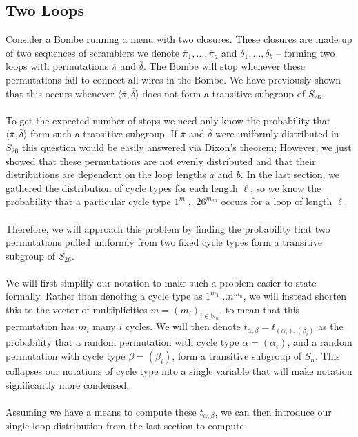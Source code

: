 \subsection{Two Loops}
Consider a Bombe running a menu with two closures. These closures are
made up of two sequences of scramblers we denote $\overline\pi_1,
\dots, \overline\pi_a$ and
$\overline\delta_1,\dots,\overline\delta_b$ -- forming two loops with
permutations $\overline\pi$ and $\overline\delta$. The Bombe will
stop whenever these permutations fail to connect all wires in the
Bombe. We have previously shown that this occurs whenever $\langle
\overline\pi, \overline\delta \rangle$ does not form a transitive
subgroup of $S_{26}$.
\\\\To get the expected number of stops we need only know the
probability that $\langle \overline\pi, \overline\delta \rangle$ form
such a transitive subgroup. If $\overline\pi$ and $\overline\delta$
were uniformly distributed in $S_{26}$ this question would be easily
answered via Dixon's theorem; However, we just showed that these
permutations are not evenly distributed and that their distributions are
dependent on the loop lengths $a$ and $b$. In the last section, we
gathered the distribution of cycle types for each length $\ell$, so we know the
probability that a particular cycle type $1^{m_1}\dots26^{m_{26}}$
occurs for a loop of length $\ell$.
\\\\Therefore, we will approach this problem by finding the
probability that two permutations pulled uniformly from two fixed
cycle types form a transitive subgroup of $S_{26}$.
\\\\We will first simplify our notation to make such a problem easier
to state formally. Rather than denoting a cycle type as $1^{m_1}\dots
n^{m_{n}}$, we will instead shorten this to the vector of
multiplicities $m=(m_i)_{i\in\mathbb{N}_n}$, to mean
that this permutation has $m_i$ many $i$ cycles. We will then denote
$t_{\alpha, \beta} =t_{(\alpha_i), (\beta_i)}$ as the probability
that a random permutation with cycle type $\alpha =(\alpha_i)$, and a
random permutation with cycle type $\beta = (\beta_i)$, form a
transitive subgroup of $S_n$. This collapses our notations of cycle
type into a single variable that will make notation significantly
more condensed.
\\\\Assuming we have a means to compute these $t_{\alpha, \beta}$, we
can then introduce our single loop distribution from the last section to compute
